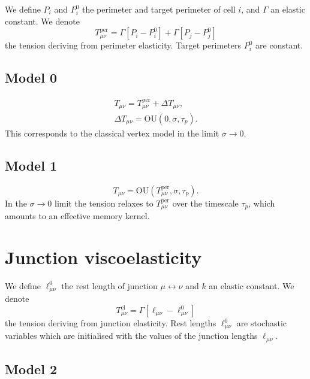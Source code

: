\documentclass[aps, superscriptaddress, notitlepage, longbibliography]{revtex4-1}
\begin{document}
We define $P_i$ and $P_i^0$ the perimeter and target perimeter of cell $i$, and $\Gamma$ an elastic constant. We denote
\begin{equation}
T_{\mu\nu}^{\mathrm{per}} = \Gamma[P_i - P_i^0] + \Gamma[P_j - P_j^0]
\end{equation}
the tension deriving from perimeter elasticity. Target perimeters $P_i^0$ are constant.

\subsection{Model 0}

\begin{subequations}
\begin{align}
T_{\mu\nu} = T_{\mu\nu}^{\mathrm{per}} + \Delta T_{\mu\nu},\\
\Delta T_{\mu\nu} = \mathrm{OU}(0, \sigma, \tau_p).
\end{align}
\end{subequations}
This corresponds to the classical vertex model in the limit $\sigma \to 0$.

\subsection{Model 1}

\begin{equation}
T_{\mu\nu} = \mathrm{OU}(T_{\mu\nu}^{\mathrm{per}}, \sigma, \tau_p).
\end{equation}
In the $\sigma \to 0$ limit the tension relaxes to $T_{\mu\nu}^{\mathrm{per}}$ over the timescale $\tau_p$, which amounts to an effective memory kernel.

\section{Junction viscoelasticity}

We define $\ell_{\mu\nu}^0$ the rest length of junction $\mu \leftrightarrow \nu$ and $k$ an elastic constant. We denote
\begin{equation}
T_{\mu\nu}^{\mathrm{el}} = \Gamma [\ell_{\mu\nu} - \ell_{\mu\nu}^0]
\end{equation}
the tension deriving from junction elasticity. Rest lengths $\ell_{\mu\nu}^0$ are stochastic variables which are initialised with the values of the junction lengths $\ell_{\mu\nu}$.

\subsection{Model 2}
\end{document}
